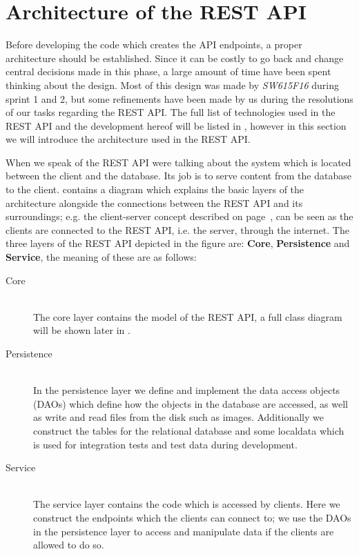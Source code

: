 \section{Architecture of the REST API}\label{sec:architecture}
Before developing the code which creates the API endpoints, a proper architecture should be established.
Since it can be costly to go back and change central decisions made in this phase, a large amount of time have been spent thinking about the design.
Most of this design was made by \textit{SW615F16} during sprint 1 and 2, but some refinements have been made by us during the resolutions of our tasks regarding the REST API.
The full list of technologies used in the REST API and the development hereof will be listed in , however in this section we will introduce the architecture used in the REST API.

When we speak of the REST API were talking about the system which is located between the client and the database.
Its job is to serve content from the database to the client.
 contains a diagram which explains the basic layers of the architecture alongside the connections between the REST API and its surroundings; e.g. the client-server concept described on page~\pageref{client-server-rest}, can be seen as the clients are connected to the REST API, i.e. the server, through the internet.
The three layers of the REST API depicted in the figure are: \textbf{Core}, \textbf{Persistence} and \textbf{Service}, the meaning of these are as follows:
\begin{description}
    \item[Core] \hfill \\
    The core layer contains the model of the REST API, a full class diagram will be shown later in .

    \item[Persistence] \hfill \\
    In the persistence layer we define and implement the data access objects (DAOs) which define how the objects in the database are accessed, as well as write and read files from the disk such as images.
    Additionally we construct the tables for the relational database and some localdata which is used for integration tests and test data during development.

    \item[Service] \hfill \\
    The service layer contains the code which is accessed by clients.
    Here we construct the endpoints which the clients can connect to; we use the DAOs in the persistence layer to access and manipulate data if the clients are allowed to do so.
\end{description}

